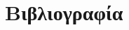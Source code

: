 \documentclass[10pt,lualatex]{beamer}
\begin{document}
\begin{frame}
  \centering
  
\end{frame}


\section{Βιβλιογραφία}
\begin{frame}
  \printbibliography
\end{frame}
\end{document}
